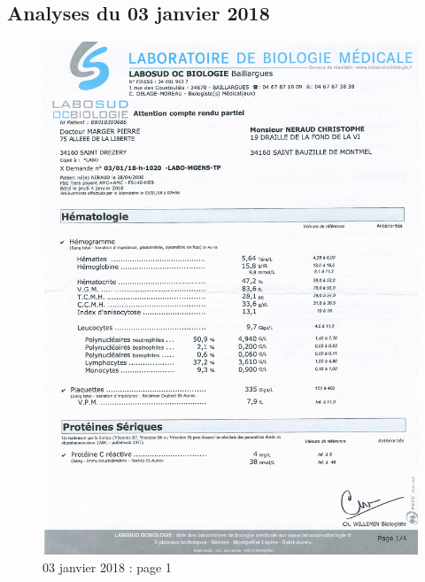 \documentclass[12pt]{article}
\begin{document}
	\subsection{Analyses du 03 janvier 2018}
	\begin{figure}[!h]
		\begin{center}
		\includegraphics[angle=180, scale=0.71]{03-01-2018/p1.JPG}
		\end{center}
		\caption{03 janvier 2018 : page 1}
	\end{figure}
	
\end{document}
